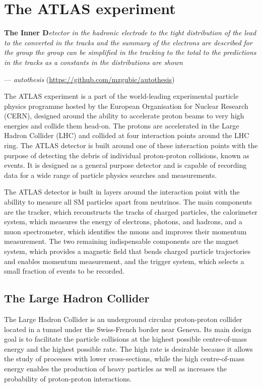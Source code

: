 \chapter{The ATLAS experiment}

\textbf{The Inner D}\textit{etector in the hadronic electrode to the tight distribution of the lead to the converted in the tracks and the summary of the electrons are described for the group the group can be simplified in the tracking to the total to the predictions in the tracks as a constants in the distributions are shown}
\vspace{5mm}
\begin{flushright}
--- \textit{autothesis} (\url{https://github.com/mzgubic/autothesis})
\end{flushright}

\thispagestyle{empty}
\newpage

\noindent
The ATLAS experiment is a part of the world-leading experimental particle
physics programme hosted by the European Organisation for Nuclear Research
(CERN), designed around the ability to accelerate proton beams to very high
energies and collide them head-on. The protons are accelerated in the Large
Hadron Collider (LHC) and collided at four interaction points
around the LHC ring. The ATLAS detector is built around one of these
interaction points with the purpose of detecting the debris of
individual proton-proton collisions, known as events. It is designed as a general purpose detector
and is capable of recording data for a wide range of particle physics
searches and measurements.

The ATLAS detector is built in layers around the interaction point with
the abillity to measure all SM particles apart from neutrinos. The main
components are the tracker, which reconstructs the tracks of charged 
particles, the calorimeter system, which measures the energy of
electrons, photons, and hadrons, and a muon spectrometer, which identifies
the muons and improves their momentum measurement. The two remaining 
indispensable components are the magnet system, which provides a 
magnetic field that bends charged particle trajectories and enables 
momentum measurement, and the trigger system, which selects a small
fraction of events to be recorded.

\section{The Large Hadron Collider}

The Large Hadron Collider is an underground circular proton-proton collider
located in a tunnel under the Swiss-French border near Geneva. Its main
design goal is to facilitate the particle collisions at the highest possible
centre-of-mass energy and the highest possible rate. The high rate is
desirable because it allows the study of processes with lower cross-sections, while
the high centre-of-mass energy enables the production of heavy particles as
well as increases the probability of proton-proton interactions.

